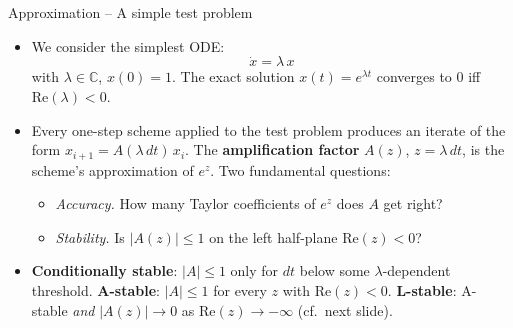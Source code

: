 \documentclass[11pt,aspectratio=169]{beamer}
\begin{document}
\begin{frame}{Approximation -- A simple test problem}

\begin{itemize}

\item We consider the simplest ODE:
  \[
    \dot x = \lambda\, x
  \]
  with $\lambda\in\mathbb C$, $x(0)=1$. The exact solution $x(t)=e^{\lambda t}$ converges to 0 iff $\mathrm{Re}(\lambda)<0$.\newline

\item Every one-step scheme applied to the test problem produces an
  iterate of the form $x_{i+1} = A(\lambda\, dt)\, x_i$. The
  \textbf{amplification factor} $A(z)$, $z=\lambda\, dt$, is the
  scheme's approximation of $e^z$. Two fundamental questions:\newline
  \begin{itemize}
  \item \emph{Accuracy.} How many Taylor coefficients of $e^z$ does
    $A$ get right?\newline
  \item \emph{Stability.} Is $|A(z)|\le 1$ on the left half-plane
    $\mathrm{Re}(z)<0$?
  \end{itemize}

  \medskip

\item \textbf{Conditionally stable}: $|A|\le 1$ only for $dt$ below
  some $\lambda$-dependent threshold. \textbf{A-stable}: $|A|\le 1$
  for every $z$ with $\mathrm{Re}(z)<0$. \textbf{L-stable}: A-stable
  \emph{and} $|A(z)|\to 0$ as $\mathrm{Re}(z)\to-\infty$
  (cf.\ next slide).

\end{itemize}

\end{frame}
\end{document}
